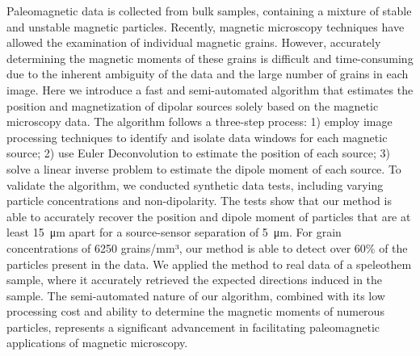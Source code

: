 Paleomagnetic data is collected from bulk samples, containing a mixture of
stable and unstable magnetic particles. Recently, magnetic microscopy
techniques have allowed the examination of individual magnetic grains. However,
accurately determining the magnetic moments of these grains is difficult and
time-consuming due to the inherent ambiguity of the data and the large number
of grains in each image. Here we introduce a fast and semi-automated algorithm
that estimates the position and magnetization of dipolar sources solely based
on the magnetic microscopy data. The algorithm follows a three-step process: 1)
employ image processing techniques to identify and isolate data windows for
each magnetic source; 2) use Euler Deconvolution to estimate the position of
each source; 3) solve a linear inverse problem to estimate the dipole moment of
each source. To validate the algorithm, we conducted synthetic data tests,
including varying particle concentrations and non-dipolarity. The tests show
that our method is able to accurately recover the position and dipole moment of
particles that are at least \qty{15}{\um} apart for a source-sensor separation
of \qty{5}{\um}. For grain concentrations of 6250 grains/mm³, our method is
able to detect over 60\% of the particles present in the data. We applied the
method to real data of a speleothem sample, where it accurately retrieved the
expected directions induced in the sample. The semi-automated nature of our
algorithm, combined with its low processing cost and ability to determine the
magnetic moments of numerous particles, represents a significant advancement in
facilitating paleomagnetic applications of magnetic microscopy.

